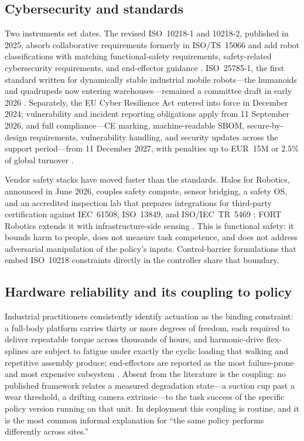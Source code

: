 \documentclass[11pt]{article}
\theoremstyle{definition}
\begin{document}
\subsection{Cybersecurity and standards}

Two instruments set dates. The revised ISO~10218-1 and 10218-2, published in 2025, absorb
collaborative requirements formerly in ISO/TS~15066 and add robot classifications with
matching functional-safety requirements, safety-related cybersecurity requirements, and
end-effector guidance \citep{iso102181,iso102182}. ISO~25785-1, the first standard written
for dynamically stable industrial mobile robots---the humanoids and quadrupeds now entering
warehouses---remained a committee draft in early 2026 \citep{iso25785}. Separately, the EU
Cyber Resilience Act entered into force in December 2024; vulnerability and incident
reporting obligations apply from 11 September 2026, and full compliance---CE marking,
machine-readable SBOM, secure-by-design requirements, vulnerability handling, and security
updates across the support period---from 11 December 2027, with penalties up to
EUR~15M or $2.5\%$ of global turnover \citep{cra,cratimeline}.

Vendor safety stacks have moved faster than the standards. Halos for Robotics, announced in
June 2026, couples safety compute, sensor bridging, a safety OS, and an accredited
inspection lab that prepares integrations for third-party certification against IEC~61508,
ISO~13849, and ISO/IEC~TR~5469 \citep{halos}; FORT Robotics extends it with
infrastructure-side sensing \citep{fort}. This is functional safety: it bounds harm to
people, does not measure task competence, and does not address adversarial manipulation of
the policy's inputs. Control-barrier formulations that embed ISO~10218 constraints directly
in the controller \citep{cbfiso} share that boundary.

\subsection{Hardware reliability and its coupling to policy}

Industrial practitioners consistently identify actuation as the binding constraint: a
full-body platform carries thirty or more degrees of freedom, each required to deliver
repeatable torque across thousands of hours, and harmonic-drive flex-splines are subject to
fatigue under exactly the cyclic loading that walking and repetitive assembly produce;
end-effectors are reported as the most failure-prone and most expensive subsystem
\citep{humanoidhw,humanoidchal}. Absent from the literature is the coupling: no published
framework relates a measured degradation state---a suction cup past a wear threshold, a
drifting camera extrinsic---to the task success of the specific policy version running on
that unit. In deployment this coupling is routine, and it is the most common informal
explanation for ``the same policy performs differently across sites.''
\end{document}
